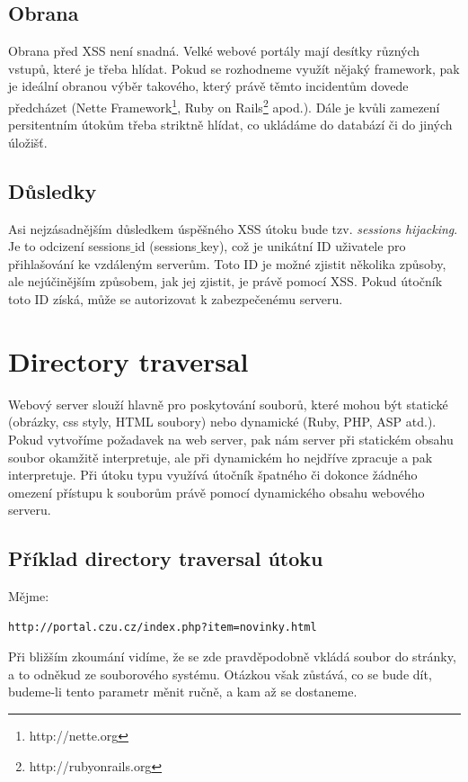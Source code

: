 \documentclass[12pt, a4paper]{report}
\begin{document}
\subsection{Obrana}
Obrana před XSS není snadná. Velké webové portály mají desítky různých vstupů, které je třeba hlídat. Pokud se rozhodneme využít nějaký framework, pak je ideální obranou výběr takového, který právě těmto incidentům dovede předcházet (Nette Framework\footnote{http://nette.org}, Ruby on Rails\footnote{http://rubyonrails.org} apod.). Dále je kvůli zamezení persitentním útokům třeba striktně hlídat, co ukládáme do databází či do jiných úložišť.

\subsection{Důsledky}
Asi nejzásadnějším důsledkem úspěšného XSS útoku bude tzv. \textit{sessions hijacking}. Je to odcizení sessions$\_$id (sessions$\_$key), což je unikátní ID uživatele pro přihlašování ke vzdáleným serverům. Toto ID je možné zjistit několika způsoby, ale nejúčinějším způsobem, jak jej zjistit, je právě pomocí XSS. Pokud útočník toto ID získá, může se autorizovat k zabezpečenému serveru.

\section{Directory traversal}
Webový server slouží hlavně pro poskytování souborů, které mohou být statické (obrázky, css styly, HTML soubory) nebo dynamické (Ruby, PHP, ASP atd.). Pokud vytvoříme požadavek na web server, pak nám server při statickém obsahu soubor okamžitě interpretuje, ale při dynamickém ho nejdříve zpracuje a pak interpretuje. Při útoku typu  využívá útočník špatného či dokonce žádného omezení přístupu k souborům právě pomocí dynamického obsahu webového serveru.

\subsection{Příklad directory traversal útoku}
Mějme:
\begin{lstlisting}[label=some-code,caption=URL adresa s podezdřením na include souboru]
http://portal.czu.cz/index.php?item=novinky.html
\end{lstlisting}
Při bližším zkoumání vidíme, že se zde pravděpodobně vkládá soubor  do stránky, a to odněkud ze souborového systému. Otázkou však zůstává, co se bude dít, budeme-li tento parametr měnit ručně, a kam až se dostaneme.
\end{document}
